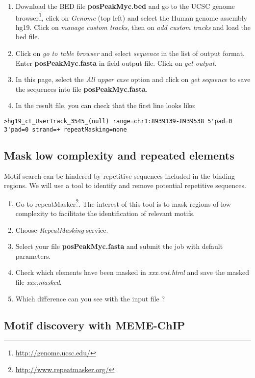\documentclass[a4paper,11pt]{article}
\begin{document}
\begin{enumerate}
\item Download the BED file \textbf{posPeakMyc.bed} and go to the UCSC genome
  browser\footnote{\url{http://genome.ucsc.edu/}}, click on \textit{Genome}
  (top left) and select the Human genome assembly hg19. Click on
  \textit{manage custom tracks}, then on \textit{add custom
    tracks} and load the bed file.  
\item Click on \emph{go to table browser} and select \textit{sequence} in
  the list of output format. Enter \textbf{posPeakMyc.fasta} in field
  output file. Click on \emph{get output}. 
\item In this page, select the \textit{All upper case} option and
  click on \textit{get sequence} to save the sequences into file
  \textbf{posPeakMyc.fasta}.
\item In the result file, you can check that the first line looks like:
\end{enumerate}
\begin{verbatim} 
>hg19_ct_UserTrack_3545_(null) range=chr1:8939139-8939538 5'pad=0 
3'pad=0 strand=+ repeatMasking=none
\end{verbatim}

\newpage
\subsection{ Mask low complexity and repeated elements}

Motif search can be hindered by repetitive sequences included in the
binding regions. We will use a tool to identify
and remove potential repetitive sequences.

\begin{enumerate}
\item Go to repeatMasker\footnote{\url{http://www.repeatmasker.org/}}. The
  interest of this tool is to mask regions of low complexity to
  facilitate the identification of relevant motifs. 
\item Choose \textit{RepeatMasking} service.
\item Select your file \textbf{posPeakMyc.fasta} and submit the job with default parameters.
\item Check which elements have been masked in \textit{xxx.out.html} and save the masked file \textit{xxx.masked}. 
\item Which difference can you see with the input file ?
\end{enumerate}

\subsection{Motif discovery with MEME-ChIP}
\end{document}

